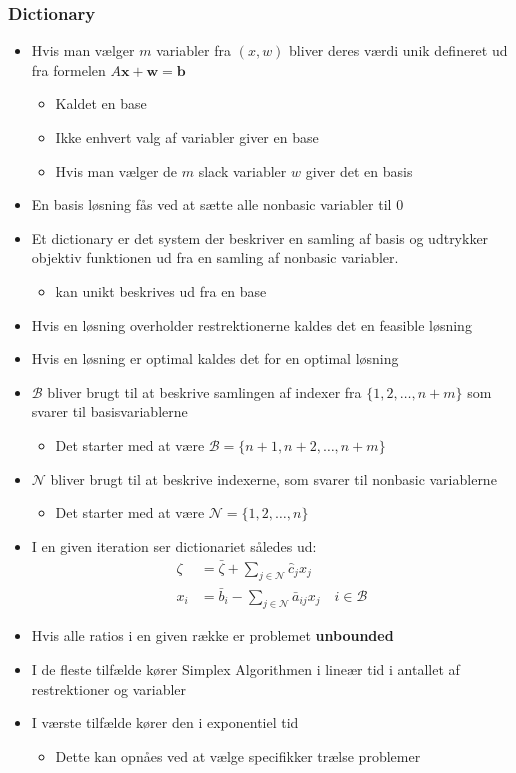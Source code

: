 \subsubsection{Dictionary}
\begin{itemize}
	\item Hvis man vælger $m$ variabler fra $(x,w)$ bliver deres værdi unik defineret ud fra formelen $A \bm x + \bm w = \bm b$
  \begin{itemize}
  	\item Kaldet en base
    \item Ikke enhvert valg af variabler giver en base
    \item Hvis man vælger de $m$ slack variabler $w$ giver det en basis
  \end{itemize}
  \item En basis løsning fås ved at sætte alle nonbasic variabler til 0
  \item Et dictionary er det system der beskriver en samling af basis og udtrykker objektiv funktionen ud fra en samling af nonbasic variabler.  
  \begin{itemize}
  	\item kan unikt beskrives ud fra en base
  \end{itemize}
  \item Hvis en løsning overholder restrektionerne kaldes det en feasible løsning
  \item Hvis en løsning er optimal kaldes det for en optimal løsning
	\item $\mathcal B$ bliver brugt til at beskrive samlingen af indexer fra $\{1,2,\dots, n+m\}$ som svarer til basisvariablerne
  \begin{itemize}
  	\item Det starter med at være $\mathcal B = \{n+1, n+2, \dots, n+m\}$
  \end{itemize}
	\item $\mathcal N$ bliver brugt til at beskrive indexerne, som svarer til nonbasic variablerne
  \begin{itemize}
  	\item Det starter med at være $\mathcal N = \{1,2, \dots, n\}$ 
  \end{itemize}
  \item I en given iteration ser dictionariet således ud:
  \begin{align*}
    \zeta &= \bar \zeta + \sum_{j \in \mathcal N} \hat c_j x_j \\
    x_i &= \bar b_i - \sum_{j \in \mathcal N} \bar a_{ij} x_j \quad i \in \mathcal B
  \end{align*}
  \item Hvis alle ratios i en given række er problemet \textbf{unbounded}  
	\item I de fleste tilfælde kører Simplex Algorithmen i lineær tid i antallet af restrektioner og variabler
  \item I værste tilfælde kører den i exponentiel tid
  \begin{itemize}
  	\item Dette kan opnåes ved at vælge specifikker trælse problemer
  \end{itemize}
\end{itemize} 

